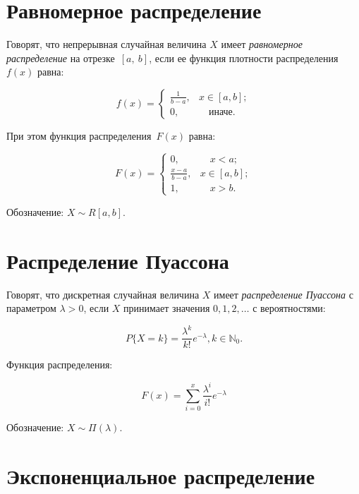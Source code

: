 \chapter{Равномерное распределение}

Говорят, что непрерывная случайная величина $X$ имеет \textit{равномерное распределение} на отрезке~$[a,~b]$, если ее функция плотности распределения~$f(x)$ равна:

\begin{equation}
	f(x) =
	\begin{cases}
		\displaystyle\frac{1}{b - a}, & x \in [a, b];\\
		0,  & \quad \text{иначе}.
	\end{cases}
\end{equation}

При этом функция распределения~$F(x)$ равна:

\begin{equation}
	F(x) =
	\begin{cases}
		0,  & \quad x < a;\\
		\displaystyle\frac{x - a}{b - a}, & x \in [a, b];\\
		1,  & \quad x > b.
	\end{cases}
\end{equation}

Обозначение: $X \sim R[a, b]$.

\chapter{Распределение Пуассона}

Говорят, что  дискретная случайная величина $X$ имеет \textit{распределение Пуассона} с параметром $\lambda > 0$, если $X$ принимает значения $0, 1, 2, \dots$ с вероятностями:

\begin{equation}
	P\{X=k\} = \frac{\lambda^k}{k!} e^{-\lambda}, k \in \mathbb{N}_0.
\end{equation}

Функция распределения: 

\begin{equation}
	F(x) = \sum\limits_{i = 0}^{x} \frac{\lambda^i}{i!} e^{-\lambda}
\end{equation}


Обозначение: $X \sim \Pi(\lambda)$.


\chapter{Экспоненциальное распределение}

